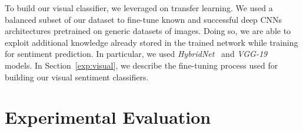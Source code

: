 To build our visual classifier, we leveraged on transfer learning. We used  a balanced subset of our dataset {\TSA}
to {fine-tune} known and successful deep CNNs architectures pretrained on generic datasets of images. Doing so, we are able to exploit additional knowledge already stored in the trained network while training for sentiment prediction. In particular, we used \textit{HybridNet}~\cite{zhou2014learning} and \textit{VGG-19}~\cite{simonyan2014very} models.
In Section~\ref{exp:visual}, we describe the fine-tuning process used for building our visual sentiment classifiers.

\section{Experimental Evaluation}
\label{sec:vsa:experiments}

